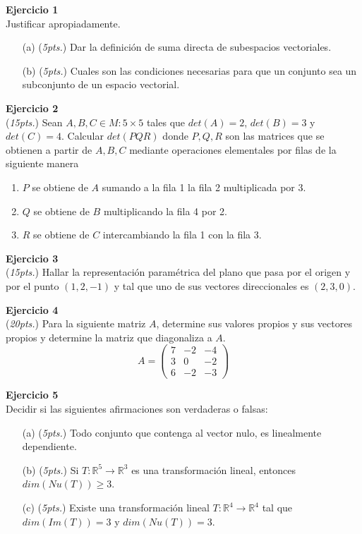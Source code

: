 \documentclass{article}
\newenvironment{problem}[2][Ejercicio]
    { \begin{mdframed}[backgroundcolor=gray!20] \textbf{#1 #2} \\}
    {  \end{mdframed}}
\begin{document}

\begin{problem}{1}
    Justificar apropiadamente.
    \begin{itemize}
        \item[(a)] (\textit{5pts.}) Dar la definición de suma directa de subespacios vectoriales.
        \item[(b)] (\textit{5pts.}) Cuales son las condiciones necesarias para que un conjunto sea un subconjunto de un espacio vectorial. 
    \end{itemize}
\end{problem}

\begin{problem}{2}
    (\textit{15pts.}) Sean $A,B,C \in M:{5 \times 5}$ tales que $det(A)=2$, $det(B)=3$ y $det(C)=4$. Calcular $det(PQR)$ donde $P,Q,R$ son las matrices que se obtienen a partir de $A,B,C$ mediante operaciones elementales por filas de la siguiente manera
    \begin{enumerate}
        \item $P$ se obtiene de $A$ sumando a la fila 1 la fila 2 multiplicada por 3.
        \item $Q$ se obtiene de $B$ multiplicando la fila 4 por 2.
        \item $R$ se obtiene de $C$ intercambiando la fila 1 con la fila 3.
    \end{enumerate}
\end{problem}

\begin{problem}{3}
    (\textit{15pts.}) Hallar la representación paramétrica del plano que pasa por el origen y por el punto $(1,2,-1)$ y tal que uno de sus vectores direccionales es $(2,3,0)$.
\end{problem}

\begin{problem}{4}
    (\textit{20pts.}) Para la siguiente matriz $A$, determine sus valores propios y sus vectores propios y determine la matriz que diagonaliza a $A$.
    $$
    A = \begin{pmatrix}
        7 & -2 & -4 \\
        3 & 0 & -2 \\
        6 & -2 & -3
    \end{pmatrix}
    $$
\end{problem}

\begin{problem}{5}
    Decidir si las siguientes afirmaciones son verdaderas o falsas:
    \begin{enumerate}
        \item[(a)] (\textit{5pts.}) Todo conjunto que contenga al vector nulo, es linealmente dependiente.
        \item[(b)] (\textit{5pts.}) Si $T: \mathbb{R}^5 \to \mathbb{R}^3$ es una transformación lineal, entonces $dim(Nu(T)) \geq 3$.
        \item[(c)] (\textit{5pts.}) Existe una transformación lineal $T: \mathbb{R}^4 \to \mathbb{R}^4$ tal que $dim(Im(T))=3$ y $dim(Nu(T))=3$.
    \end{enumerate}
\end{problem}
\end{document}
